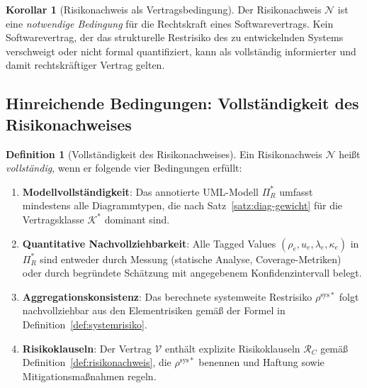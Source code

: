 ﻿\documentclass[a4paper,12pt]{article}
\theoremstyle{definition}
\newtheorem{definition}{Definition}
\newtheorem{korollar}{Korollar}
\begin{document}
\begin{korollar}[Risikonachweis als Vertragsbedingung]
\label{kor:bedingung}
    Der Risikonachweis $\mathcal{N}$ ist eine \emph{notwendige Bedingung} f\"ur die
    Rechtskraft eines Softwarevertrags. Kein Softwarevertrag, der das strukturelle
    Restrisiko des zu entwickelnden Systems verschweigt oder nicht formal quantifiziert,
    kann als vollst\"andig informierter und damit rechtskr\"aftiger Vertrag gelten.
\end{korollar}

\subsection{Hinreichende Bedingungen: Vollst\"andigkeit des Risikona\-chweis\-es}

\begin{definition}[Vollst\"andigkeit des Risikona\-chweis\-es]
\label{def:vollstaendigkeit-rn}
    Ein Risikonachweis $\mathcal{N}$ hei\ss{}t \emph{vollst\"andig}, wenn er
    folgende vier Bedingungen erf\"ullt:
    \begin{enumerate}[label=(\roman*)]
        \item \textbf{Modellvollst\"andigkeit}: Das annotierte UML-Modell $\Pi_R^*$
              umfasst mindestens alle Diagrammtypen, die nach Satz~\ref{satz:diag-gewicht}
              f\"ur die Vertragsklasse $\mathcal{K}^*$ dominant sind.
        \item \textbf{Quantitative Nachvollziehbarkeit}: Alle Tagged Values
              $(\rho_e, u_e, \lambda_e, \kappa_e)$ in $\Pi_R^*$ sind entweder durch
              Messung (statische Analyse, Coverage-Metriken) oder durch begr\"undete
              Sch\"atzung mit angegebenem Konfidenzintervall belegt.
        \item \textbf{Aggregationskonsistenz}: Das berechnete systemweite Restrisiko
              $\rho^{\mathrm{sys}*}$ folgt nachvollziehbar aus den Elementrisiken
              gem\"a\ss{} der Formel in Definition~\ref{def:systemrisiko}.
        \item \textbf{Risikoklauseln}: Der Vertrag $\mathcal{V}$ enth\"alt explizite
              Risikoklauseln $\mathcal{R}_C$ gem\"a\ss{} Definition~\ref{def:risikonachweis},
              die $\rho^{\mathrm{sys}*}$ benennen und Haftung sowie Mitigationsma\ss{}nahmen
              regeln.
    \end{enumerate}
\end{definition}
\end{document}

